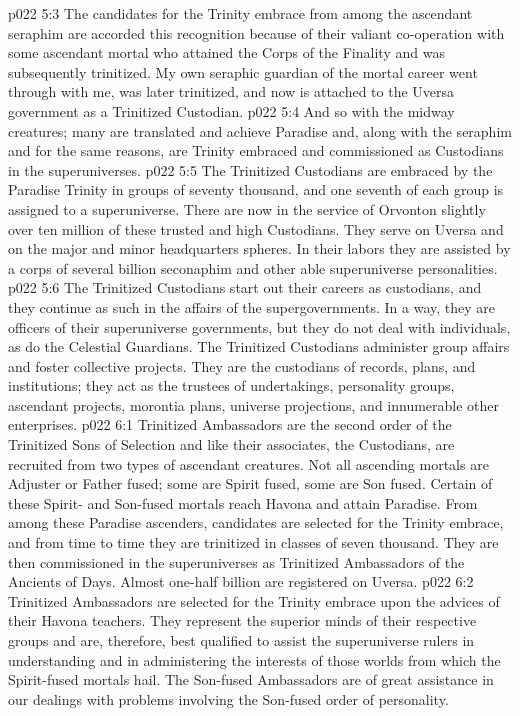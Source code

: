 \vs p022 5:3 The candidates for the Trinity embrace from among the ascendant seraphim are accorded this recognition because of their valiant co\hyp{}operation with some ascendant mortal who attained the Corps of the Finality and was subsequently trinitized. My own seraphic guardian of the mortal career went through with me, was later trinitized, and now is attached to the Uversa government as a Trinitized Custodian.
\vs p022 5:4 And so with the midway creatures; many are translated and achieve Paradise and, along with the seraphim and for the same reasons, are Trinity embraced and commissioned as Custodians in the superuniverses.
\vs p022 5:5 The Trinitized Custodians are embraced by the Paradise Trinity in groups of seventy thousand, and one seventh of each group is assigned to a superuniverse. There are now in the service of Orvonton slightly over ten million of these trusted and high Custodians. They serve on Uversa and on the major and minor headquarters spheres. In their labors they are assisted by a corps of several billion seconaphim and other able superuniverse personalities.
\vs p022 5:6 The Trinitized Custodians start out their careers as custodians, and they continue as such in the affairs of the supergovernments. In a way, they are officers of their superuniverse governments, but they do not deal with individuals, as do the Celestial Guardians. The Trinitized Custodians administer group affairs and foster collective projects. They are the custodians of records, plans, and institutions; they act as the trustees of undertakings, personality groups, ascendant projects, morontia plans, universe projections, and innumerable other enterprises.
\vs p022 6:1 Trinitized Ambassadors are the second order of the Trinitized Sons of Selection and like their associates, the Custodians, are recruited from two types of ascendant creatures. Not all ascending mortals are Adjuster or Father fused; some are Spirit fused, some are Son fused. Certain of these Spirit\hyp{} and Son\hyp{}fused mortals reach Havona and attain Paradise. From among these Paradise ascenders, candidates are selected for the Trinity embrace, and from time to time they are trinitized in classes of seven thousand. They are then commissioned in the superuniverses as Trinitized Ambassadors of the Ancients of Days. Almost one\hyp{}half billion are registered on Uversa.
\vs p022 6:2 Trinitized Ambassadors are selected for the Trinity embrace upon the advices of their Havona teachers. They represent the superior minds of their respective groups and are, therefore, best qualified to assist the superuniverse rulers in understanding and in administering the interests of those worlds from which the Spirit\hyp{}fused mortals hail. The Son\hyp{}fused Ambassadors are of great assistance in our dealings with problems involving the Son\hyp{}fused order of personality.
